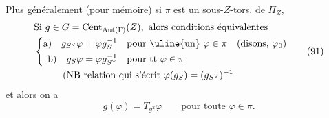 Plus généralement (pour mémoire) si $\pi$ est un sous-$Z$-tors. de $\Pi_Z$,
\[
\begin{aligned}
&\text{Si }g\in G=\mathrm{Cent}_{\mathrm{Aut}(\Gamma)}(Z),\text{ alors conditions équivalentes}\\
&\left\{\begin{aligned}
\text{a)}\quad g_{S^\vee}\varphi&=\varphi g_S^{-1} &&\text{pour \uline{un} }\varphi\in\pi\quad(\text{disons, }\varphi_0)\\
\text{b)}\quad g_S\varphi&=\varphi g_{S^\vee}^{-1} &&\text{pour tt }\varphi\in\pi
\end{aligned}\right.\\
&\hspace{3em}(\text{NB relation qui s'écrit }\varphi(g_S)=(g_{S^\vee})^{-1}
\end{aligned}\tag*{(91)}
\]
et alors on  a
\[
 g(\varphi)=T_{g^2}\varphi\qquad\text{pour toute }\varphi\in\pi.
 \tag*{(92)}
\]

